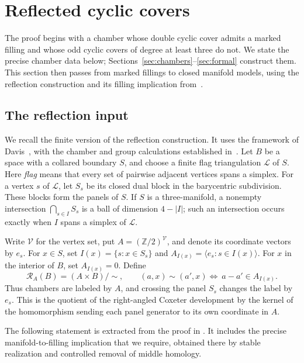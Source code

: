 \section{Reflected cyclic covers}\label{sec:reflection}

The proof begins with a chamber whose double cyclic cover admits a
marked filling and whose odd cyclic covers of degree at least three
do not.  We state the precise chamber data below;
Sections~\ref{sec:chambers}--\ref{sec:formal}
construct them.  This section then passes from marked fillings to
closed manifold models, using the reflection construction and its
filling implication from~\cite{PD}.

\subsection{The reflection input}

We recall the finite version of the reflection construction.  It uses
the framework of Davis~\cite{Davis1983,Davis2008}, with the chamber
and group calculations established in~\cite[Section~3]{PD}.
Let $B$ be a space with a collared boundary $S$, and choose a finite
flag triangulation $\mathcal L$ of $S$.  Here \emph{flag} means that
every set of pairwise adjacent vertices spans a simplex.  For a vertex
$s$ of $\mathcal L$, let $S_s$ be its closed dual block in the
barycentric subdivision.  These blocks form the panels of $S$.
If $S$ is a three-manifold, a nonempty intersection
$\bigcap_{s\in I}S_s$ is a ball of dimension $4-|I|$; such an
intersection occurs exactly when $I$ spans a simplex of $\mathcal L$.

Write $\mathcal V$ for the vertex set, put
$A=(\mathbb Z/2)^{\mathcal V}$, and denote its coordinate vectors by
$e_s$.  For $x\in S$, set $I(x)=\{s:x\in S_s\}$ and
$A_{I(x)}=\langle e_s:s\in I(x)\rangle$.  For $x$ in the interior
of $B$, set $A_{I(x)}=0$.  Define
\begin{equation}\label{refl:finite-reflection}
 \mathcal R_A(B)=(A\times B)/\sim,
 \qquad
 (a,x)\sim(a',x) \Longleftrightarrow\ a-a'\in A_{I(x)}.
\end{equation}
Thus chambers are labeled by $A$, and crossing the panel $S_s$
changes the label by $e_s$.  This is the quotient of the right-angled
Coxeter development by the kernel of the homomorphism sending each
panel generator to its own coordinate in $A$.

The following statement is extracted from the proof in
\cite[Sections~3--5]{PD}.  It includes the precise manifold-to-filling
implication that we require, obtained there by stable realization
and controlled removal of middle homology.

